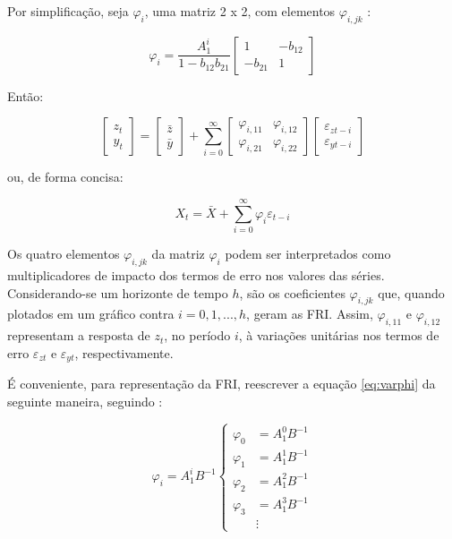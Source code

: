 Por simplificação, seja \(\varphi_i\), uma matriz 2 x 2, com elementos \(\varphi_{i,jk}\) :

\begin{equation}
\label{eq:varphi}
\varphi_i = \frac{A_1^i}{1-b_{12}b_{21}} \begin{bmatrix} 1 & -b_{12} \\ -b_{21} & 1 \end{bmatrix}
\end{equation}

Então:

\begin{equation}
\begin{bmatrix} 
z_t \\ 
y_t 
\end{bmatrix} 
= 
\begin{bmatrix} 
\bar{z} \\ 
\bar{y} 
\end{bmatrix} 
+ 
\sum_{i=0}^{\infty} 
\begin{bmatrix} 
\varphi_{i,11} & \varphi_{i,12} \\ 
\varphi_{i, 21} & \varphi_{i, 22} 
\end{bmatrix} 
\begin{bmatrix} 
\varepsilon_{z{t-i}} \\ 
\varepsilon_{y{t-i}} 
\end{bmatrix}
\end{equation}

ou, de forma concisa:

\begin{equation}
X_t = \bar{X} + \sum_{i=0}^{\infty} \varphi_i \varepsilon_{t-i}
\end{equation}

Os quatro elementos \(\varphi_{i,jk}\) da matriz \(\varphi_i\) podem ser interpretados como multiplicadores de impacto dos termos de erro nos valores das séries. 
Considerando-se um horizonte de tempo \(h\), são os coeficientes \(\varphi_{i,jk}\) que, quando plotados em um gráfico contra \(i = 0, 1, ..., h\), geram as FRI. Assim, \(\varphi_{i,11}\) e \(\varphi_{i,12}\) representam a resposta de \(z_t\), no período \(i\), à variações unitárias nos termos de erro \(\varepsilon_{zt}\) e \(\varepsilon_{yt}\), respectivamente. 

É conveniente, para representação da FRI, reescrever a equação \ref{eq:varphi} da seguinte maneira, seguindo \textcite{adammer_lpirfs_2019}:

\begin{equation}
\varphi_i = A_1^iB^{-1}
    \left\{
    \begin{aligned}
        \varphi_0 &= A_1^0 B^{-1} \\
        \varphi_1 &= A_1^1 B^{-1} \\
        \varphi_2 &= A_1^2 B^{-1} \\
        \varphi_3 &= A_1^3 B^{-1} \\
        &\vdots
    \end{aligned}
    \right.
\end{equation}

